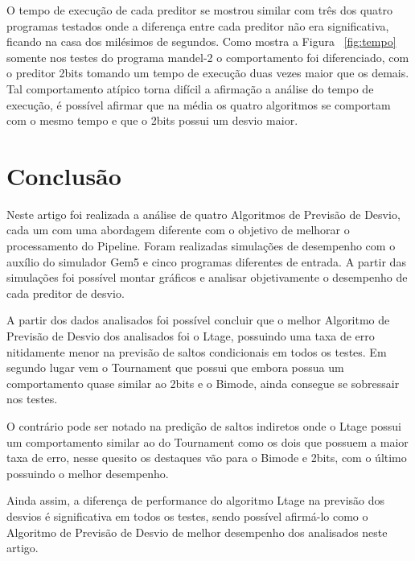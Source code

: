 \documentclass[12pt]{article}
\begin{document}
O tempo de execução de cada preditor se mostrou similar com três dos quatro programas testados onde a diferença entre cada preditor não era significativa, ficando na casa dos milésimos de segundos. Como mostra a Figura ~\ref{fig:tempo} somente nos testes do programa mandel-2 o comportamento foi diferenciado, com o preditor 2bits tomando um tempo de execução duas vezes maior que os demais. Tal comportamento atípico torna difícil a afirmação a análise do tempo de execução, é possível afirmar que na média os quatro algoritmos se comportam com o mesmo tempo e que o 2bits possui um desvio maior.



\section{Conclusão}

Neste artigo foi realizada a análise de quatro Algoritmos de Previsão de Desvio, cada um com uma abordagem diferente com o objetivo de melhorar o processamento do Pipeline. Foram realizadas simulações de desempenho com o auxílio do simulador Gem5 e cinco programas diferentes de entrada. A partir das simulações foi possível montar gráficos e analisar objetivamente o desempenho de cada preditor de desvio.

A partir dos dados analisados foi possível concluir que o melhor Algoritmo de Previsão de Desvio dos analisados foi o Ltage, possuindo uma taxa de erro nitidamente menor na previsão de saltos condicionais em todos os testes. Em segundo lugar vem o Tournament que possui que embora possua um comportamento quase similar ao 2bits e o Bimode, ainda consegue se sobressair nos testes.

O contrário pode ser notado na predição de saltos indiretos onde o Ltage possui um comportamento similar ao do Tournament como os dois que possuem a maior taxa de erro, nesse quesito os destaques vão para o Bimode e 2bits, com o último possuindo o melhor desempenho.

Ainda assim, a diferença de performance do algoritmo Ltage na previsão dos desvios é significativa em todos os testes, sendo possível afirmá-lo como o Algoritmo de Previsão de Desvio de melhor desempenho dos analisados neste artigo.



\end{document}
